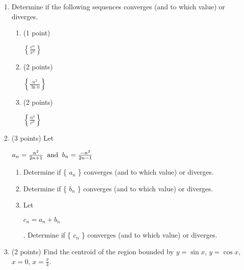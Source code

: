 \documentclass[paper=a4, fontsize=11pt]{scrartcl} %
\numberwithin{equation}{section} %
\numberwithin{figure}{section} %
\numberwithin{table}{section} %
\begin{document}
\begin{enumerate}
\item Determine if the following sequences converges (and to which value) or diverges. 
\begin{enumerate}
\item (1 point)\hspace{4mm}\begin{large}$\left\{\frac{e^n}{\pi^n}\right\}$\end{large}
\vspace{2.5in}
\item (2 points)\hspace{4mm} \begin{large}$\left\{\frac{n^2}{\ln n}\right\}$\end{large}
\vspace{2.5in}
\item (2 points)\hspace{4mm} \begin{large}$\left\{\frac{n^3}{e^n}\right\}$\end{large}
\end{enumerate}

\newpage
\item (3 points) Let \begin{large}$a_n=\frac{n^2}{2n+1}\hspace{2mm}\text{and}\hspace{2mm}b_n=\frac{-n^2}{2n-1}$\end{large}
\begin{enumerate}
\item Determine if \{ $a_n$ \} converges (and to which value) or diverges.
\vspace{2.5in}
\item Determine if \{ $b_n$ \} converges (and to which value) or diverges.
\vspace{2.5in}
\item Let \begin{large}$c_n=a_n+b_n$\end{large}. Determine if \{ $c_n$ \} converges (and to which value) or diverges.
\end{enumerate}

\newpage
\item (2 points) Find the centroid of the region bounded by $y= \sin x$, $y= \cos x$, $x = 0$, $x = \frac{\pi}{4}$. 
\end{enumerate}

\end{document}

